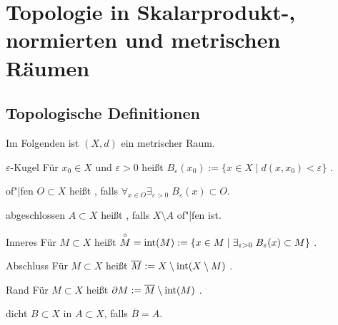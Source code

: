 \chapter{%
    Topologie in Skalarprodukt-, normierten und metrischen Räumen%
}

\section{%
    Topologische Definitionen%
}

\begin{Bem}
    Im Folgenden ist $(X, d)$ ein metrischer Raum.
\end{Bem}

\begin{Def}{$\varepsilon$-Kugel}
    Für $x_0 \in X$ und $\varepsilon > 0$ heißt
    $B_\varepsilon(x_0) := \{x \in X \;|\; d(x, x_0) < \varepsilon\}$
    .
\end{Def}

\begin{Def}{of"|fen}
    $O \subset X$ heißt , falls
    $\forall_{x \in O} \exists_{\varepsilon > 0}\; B_\varepsilon(x) \subset O$.
\end{Def}

\begin{Def}{abgeschlossen}
    $A \subset X$ heißt , falls $X \setminus A$ of"|fen ist.
\end{Def}

\vspace{-2mm}

\begin{Def}{Inneres}
    Für $M \subset X$ heißt $\overset{\circ}{M} = \operatorname{int}(M) :=
    \{x \in M \;|\; \exists_{\varepsilon > 0}\; B_\varepsilon(x) \subset M\}$
    .
\end{Def}

\begin{Def}{Abschluss}
    Für $M \subset X$ heißt $\overline{M} := X \setminus \operatorname{int}(X \setminus M)$
    .
\end{Def}

\begin{Def}{Rand}
    Für $M \subset X$ heißt $\partial M := \overline{M} \setminus \operatorname{int}(M)$
    .
\end{Def}

\begin{Def}{dicht}
    $B \subset X$  in $A \subset X$, falls $\overline{B} = A$.
\end{Def}

